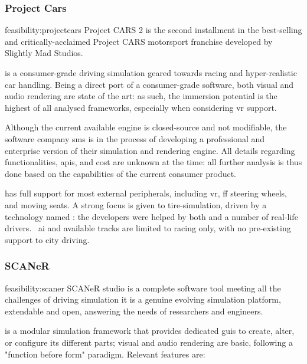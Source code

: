 \subsubsection{Project Cars}

\begin{excerpt}{feasibility:projectcars}
    Project CARS 2 is the second installment in the best-selling and critically-acclaimed Project CARS motorsport franchise developed by Slightly Mad Studios.
\end{excerpt}

 is a consumer-grade driving simulation geared towards racing and hyper-realistic car handling. Being a direct port of a consumer-grade software, both visual and audio rendering are state of the art: as such, the immersion potential is the highest of all analysed \glspl{framework}, especially when considering \gls{vr} support.

Although the current available engine is closed-source and not modifiable, the software company \gls{sms} is in the process of developing a professional and enterprise version of their simulation and rendering engine. All details regarding functionalities, \glspl{api}, and cost are unknown at the time: all further analysis is thus done based on the capabilities of the current consumer product.

 has full support for most external peripherals, including \gls{vr}, \gls{ff} steering wheels, and moving seats. A strong focus is given to tire-simulation, driven by a technology named : the developers were helped by both  and a number of real-life drivers.~\cite{feasibility:projectcarstires} \gls{ai} and available tracks are limited to racing only, with no pre-existing support to city driving.

\subsubsection{SCANeR}

\begin{excerpt}{feasibility:scaner}
SCANeR studio is a complete software tool meeting all the challenges of driving simulation \CHARomissis{} it is a genuine evolving simulation platform, extendable and open, answering the needs of researchers and engineers.
\end{excerpt}

 is a modular simulation \gls{framework} that provides dedicated \glspl{gui} to create, alter, or configure its different parts; visual and audio rendering are basic, following a "function before form" paradigm. Relevant \glspl{feature} are:

